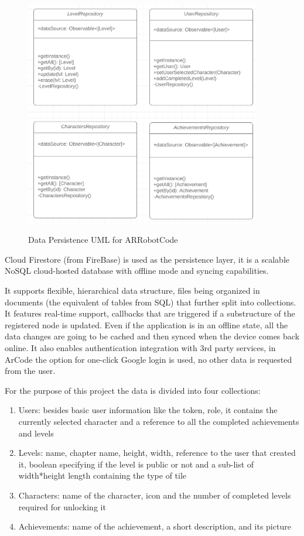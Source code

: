 \documentclass[12 pct]{report}
\begin{document}
\begin{figure}[H]
\includegraphics[width=0.92\textwidth]{ArRobotCodePersistUML}
\centering
\label{fig:arrobotcode-persist}
\caption{Data Persistence UML for ARRobotCode}
\end{figure}


Cloud Firestore (from FireBase) \cite{wingerath2019real} is used as the persistence layer, it is a scalable NoSQL \cite{strauch2011nosql} cloud-hosted database with offline mode and syncing capabilities.

It supports flexible, hierarchical data structure, files being organized in documents (the equivalent of tables from SQL) that further split into collections. It features real-time support, callbacks that are triggered if a substructure of the registered node is updated. Even if the application is in an offline state, all the data changes are going to be cached and then synced when the device comes back online. It also enables authentication integration with 3rd party services, in ArCode the option for one-click Google login is used, no other data is requested from the user.

For the purpose of this project the data is divided into four collections:
\begin{enumerate}
\item Users: besides basic user information like the token, role, it contains the currently selected character and a reference to all the completed achievements and levels
\item Levels: name, chapter name, height, width, reference to the user that created it, boolean specifying if the level is public or not and a sub-list of width*height length containing the type of tile
\item Characters: name of the character, icon and the number of completed levels required for unlocking it
\item Achievements: name of the achievement, a short description, and its picture
\end{enumerate}
\end{document}
